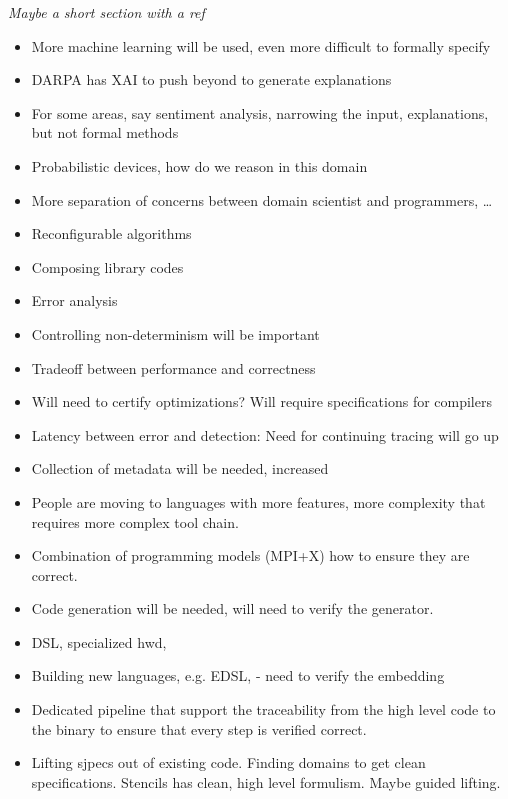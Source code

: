 \begin{itemize}
 {\em Maybe a short section with a ref}

\begin{itemize}
\item More machine learning will be used, even more difficult to formally specify

\item DARPA has XAI to push beyond to generate explanations

\item For some areas, say sentiment analysis, narrowing the input, explanations, but not formal methods

\item Probabilistic devices, how do we reason in this domain

\item More separation of concerns between domain scientist and programmers, …

\item Reconfigurable algorithms

\item Composing library codes

\item Error analysis

\item Controlling non-determinism will be important 

\item Tradeoff between performance and correctness

\item Will need to certify optimizations? Will require specifications for compilers

\item Latency between error and detection: Need for continuing tracing will go up

\item Collection of metadata will be needed, increased 
\item People are moving to languages with more features, more complexity that requires more complex tool chain.

\item Combination of programming models (MPI+X) how to ensure they are correct.

\item Code generation will be needed, will need to verify the generator.

\item DSL, specialized hwd, 

\item Building new languages, e.g. EDSL,  - need to verify the embedding
\item Dedicated pipeline that support the traceability from the high level code to the binary to ensure that every step is verified correct.

\item Lifting sjpecs out of  existing code.  Finding domains to get clean specifications. Stencils has clean, high level formulism.  Maybe guided lifting. 

\end{itemize}

\end{itemize}
